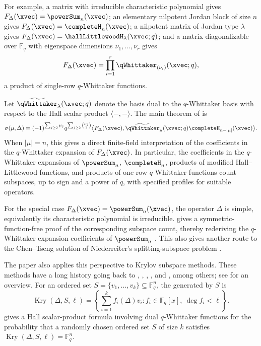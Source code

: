 For example, a matrix with irreducible characteristic polynomial gives
$F_\Delta(\xvec)=\powerSum_n(\xvec)$; an elementary nilpotent Jordan block of
size $n$ gives $F_\Delta(\xvec)=\completeH_n(\xvec)$; a nilpotent matrix of
Jordan type $\lambda$ gives
$F_\Delta(\xvec)=\hallLittlewoodH_\lambda(\xvec;q)$; and a matrix
diagonalizable over $\mathbb{F}_q$ with eigenspace dimensions
$\nu_1,\dotsc,\nu_r$ gives
\[
F_\Delta(\xvec)=\prod_{i=1}^r \qWhittaker_{(\nu_i)}(\xvec;q),
\]
a product of single-row $q$-Whittaker functions.

Let \(\widetilde{\qWhittaker}_\lambda(\xvec;q)\) denote the basis dual to the
$q$-Whittaker basis with respect to the Hall scalar product
$\langle -,- \rangle$.  The main theorem of \cite{Ram2026} is
\[
\sigma(\mu,\Delta)
=
(-1)^{\sum_{j \geq 2}\mu_j}
q^{\sum_{j \geq 2}\binom{\mu_j}{2}}
\bigl\langle
F_\Delta(\xvec),
\widetilde{\qWhittaker}_\mu(\xvec;q)\completeH_{n-|\mu|}(\xvec)
\bigr\rangle.
\]
When $|\mu|=n$, this gives a direct finite-field interpretation of the
coefficients in the $q$-Whittaker expansion of $F_\Delta(\xvec)$.  In
particular, the coefficients in the $q$-Whittaker expansions of
$\powerSum_n$, $\completeH_n$, products of modified Hall--Littlewood functions,
and products of one-row $q$-Whittaker functions count subspaces, up to sign and
a power of $q$, with specified profiles for suitable operators.

For the special case $F_\Delta(\xvec)=\powerSum_n(\xvec)$, the operator
$\Delta$ is simple, equivalently its characteristic polynomial is irreducible.
 gives a symmetric-function-free proof of the corresponding
subspace count, thereby rederiving the $q$-Whittaker expansion coefficients of
$\powerSum_n$ \cite{Ram2024x}.  This also gives another route to the
Chen--Tseng solution of Niederreiter's splitting-subspace problem
\cite[Cor.~2.9]{Ram2024x}.

The paper also applies this perspective to Krylov subspace methods. These
methods have a long history going back to , ,
, , and ,
among others; see
\cite{LiesenStrakos2013} for an overview. For an ordered set
$S=\{v_1,\dotsc,v_k\}\subseteq \mathbb{F}_q^n$, the
\label{truncatedKrylovSubspace} generated by $S$ is
\[
\operatorname{Kry}(\Delta,S,\ell)
=
\left\{
\sum_{i=1}^k f_i(\Delta)v_i :
f_i\in \mathbb{F}_q[x],\ \deg f_i<\ell
\right\}.
\]
\cite[Thm.~7.1]{Ram2026} gives a Hall scalar-product
formula involving dual $q$-Whittaker functions for the probability that a
randomly chosen ordered set $S$ of size $k$ satisfies
$\operatorname{Kry}(\Delta,S,\ell)=\mathbb{F}_q^n$.



